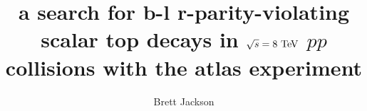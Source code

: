 \title{a search for b-l r-parity-violating scalar top decays
  in $\sqrt{s} = 8 \TeV$ $pp$ collisions with the atlas experiment}
    
\author{Brett Jackson}

\newcommand{\adviser}{Evelyn Thomson, Associate Professor, Physics}
\newcommand{\advisershort}{Evelyn Thomson}

\newcommand{\myinstitution}{The University of Pennsylvania}

\newcommand{\chairperson}{Marija Drndic, Professor, Physics}

\newcommand{\committeeOne}
    {I. Joseph Kroll, Professor, Physics}
\newcommand{\committeeTwo}
    {Burt Ovrut, Professor, Physics}
\newcommand{\committeeThree}
    {Ravi Sheth, Professor, Physics}
\newcommand{\committeeFour}
    {Hugh Williams, Professor, Physics}



